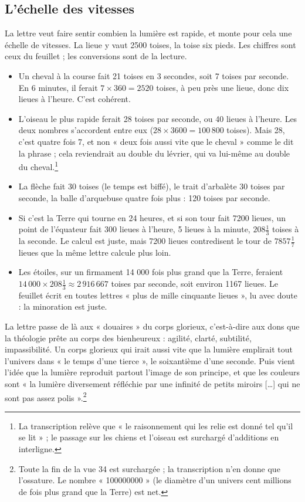 \documentclass[11pt,a4paper]{article}
\begin{document}
\subsection*{L'échelle des vitesses}

La lettre veut faire sentir combien la lumière est rapide, et monte pour cela
une échelle de vitesses. La lieue y vaut 2500 toises, la toise six pieds. Les
chiffres sont ceux du feuillet ; les conversions sont de la lecture.
\begin{itemize}
  \item Un cheval à la course fait 21 toises en 3 secondes, soit 7 toises par
    seconde. En 6 minutes, il ferait \(7\times360=2520\) toises, à peu près une
    lieue, donc dix lieues à l'heure. C'est cohérent.
  \item L'oiseau le plus rapide ferait 28 toises par seconde, ou 40 lieues à
    l'heure. Les deux nombres s'accordent entre eux (\(28\times3600=100\,800\)
    toises). Mais 28, c'est quatre fois 7, et non « deux fois aussi vite que le
    cheval » comme le dit la phrase ; cela reviendrait au double du lévrier, qui
    va lui-même au double du cheval.\footnote{La transcription relève que « le
    raisonnement qui les relie est donné tel qu'il se lit » ; le passage sur
    les chiens et l'oiseau est surchargé d'additions en interligne.}
  \item La flèche fait 30 toises (le temps est biffé), le trait d'arbalète 30
    toises par seconde, la balle d'arquebuse quatre fois plus : 120 toises par
    seconde.
  \item Si c'est la Terre qui tourne en 24 heures, et si son tour fait 7200
    lieues, un point de l'équateur fait 300 lieues à l'heure, 5 lieues à la
    minute, \(208\frac13\) toises à la seconde. Le calcul est juste, mais 7200
    lieues contredisent le tour de \(7857\frac17\) lieues que la même lettre
    calcule plus loin.
  \item Les étoiles, sur un firmament 14 000 fois plus grand que la Terre,
    feraient \(14\,000\times208\frac13\approx2\,916\,667\) toises par seconde,
    soit environ 1167 lieues. Le feuillet écrit en toutes lettres « plus de
    mille cinquante lieues », lu avec doute : la minoration est juste.
\end{itemize}
La lettre passe de là aux « douaires » du corps glorieux, c'est-à-dire aux dons
que la théologie prête au corps des bienheureux : agilité, clarté, subtilité,
impassibilité. Un corps glorieux qui irait aussi vite que la lumière
emplirait tout l'univers dans « le temps d'une tierce », le soixantième d'une
seconde. Puis vient l'idée que la lumière reproduit partout l'image de son
principe, et que les couleurs sont « la lumière diversement réfléchie par une
infinité de petits miroirs […] qui ne sont pas assez polis ».\footnote{Toute la
fin de la vue 34 est surchargée ; la transcription n'en donne que l'ossature.
Le nombre « 100000000 » (le diamètre d'un univers cent millions de fois plus
grand que la Terre) est net.}
\end{document}
